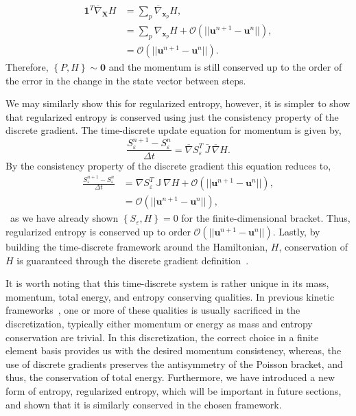 \documentclass[preprint,12pt]{elsarticle}
\theoremstyle{definition}
\begin{document}
\begin{align*}
\mathbf{1}^T \overline{\nabla}_{\boldsymbol{X}} H &= \sum_p \overline{\nabla}_{\boldsymbol{x}_p} H,\\
&= \sum_p \nabla_{\boldsymbol{x}_p} H + \mathcal{O} \left(||\boldsymbol{u}^{n+1}-\boldsymbol{u}^{n}||\right),\\
&= \mathcal{O} \left(||\boldsymbol{u}^{n+1}-\boldsymbol{u}^{n}||\right).
\end{align*}
Therefore, $\left\{ P,H \right\} \sim \mathbf{0}$ and the momentum is still conserved up to the order of the error in the change in the state vector between steps.

We may similarly show this for regularized entropy, however, it is simpler to show that regularized entropy is conserved using just the consistency property of the discrete gradient. The time-discrete update equation for momentum is given by,
\begin{equation*}
    \frac{S_{\varepsilon}^{n+1} - S_{\varepsilon}^{n}}{\Delta t} = \overline{\nabla} S_{\varepsilon}^T \, \bar{J} \, \overline{\nabla} H .
\end{equation*}
By the consistency property of the discrete gradient this equation reduces to,
\begin{align*}
    \frac{S_{\varepsilon}^{n+1} - S_{\varepsilon}^{n}}{\Delta t} &= \nabla S_{\varepsilon}^T \,\mathbb{J} \, \nabla H  + \mathcal{O} \left( ||\boldsymbol{u}^{n+1} - \boldsymbol{u}^n|| \right),\\
    &= \mathcal{O} \left( ||\boldsymbol{u}^{n+1} - \boldsymbol{u}^n|| \right),
\end{align*}\
as we have already shown $\left\{S_{\varepsilon},H\right\}=0$ for the finite-dimensional bracket. Thus, regularized entropy  is conserved up to order $\mathcal{O} \left( ||\mathbf{u}^{n+1} - \mathbf{u}^n|| \right)$. Lastly, by building the time-discrete framework around the Hamiltonian, $H$, conservation of $H$ is guaranteed through the discrete gradient definition~\cite{Kraus2017,Li2023}.


It is worth noting that this time-discrete system is rather unique in its mass, momentum, total energy, and entropy conserving qualities. In previous kinetic frameworks~\cite{BirdsallLangdon,Esirkepov2001,Markidis2011}, one or more of these qualities is usually sacrificed in the discretization, typically either momentum or energy as mass and entropy conservation are trivial. In this discretization, the correct choice in a finite element basis provides us with the desired momentum consistency, whereas, the use of discrete gradients preserves the antisymmetry of the Poisson bracket, and thus, the conservation of total energy. Furthermore, we have introduced a new form of entropy, regularized entropy, which will be important in future sections, and shown that it is similarly conserved in the chosen framework.  
\end{document}
